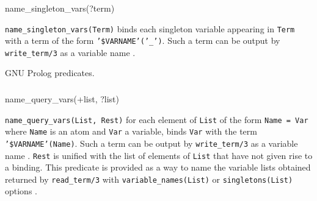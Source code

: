 \subsubsection{\label{name-singleton-vars/1}}

\begin{TemplatesOneCol}
name\_singleton\_vars(?term)

\end{TemplatesOneCol}

\Description

\texttt{name\_singleton\_vars(Term)} binds each singleton variable appearing
in \texttt{Term} with a term of the form \texttt{'\$VARNAME'('\_')}. Such a
term can be output by \texttt{write\_term/3} as a variable name
.

\PlErrorsNone

\Portability

GNU Prolog predicates.

\subsubsection{\label{name-query-vars/2}}

\begin{TemplatesOneCol}
name\_query\_vars(+list, ?list)

\end{TemplatesOneCol}

\Description

\texttt{name\_query\_vars(List, Rest)} for each element of \texttt{List} of
the form \texttt{Name = Var} where \texttt{Name} is an atom and \texttt{Var}
a variable, binds \texttt{Var} with the term \texttt{'\$VARNAME'(Name)}.
Such a term can be output by \texttt{write\_term/3} as a variable name
. \texttt{Rest} is unified with the list of elements of
\texttt{List} that have not given rise to a binding. This predicate is
provided as a way to name the variable lists obtained returned by
\texttt{read\_term/3} with \texttt{variable\_names(List)} or
\texttt{singletons(List)} options .

\begin{PlErrors}




\end{PlErrors}

